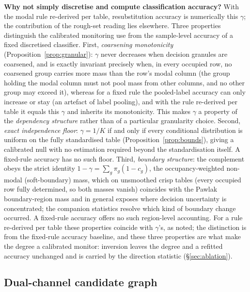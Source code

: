 \documentclass[11pt,a4paper]{article}
\begin{document}
\textbf{Why not simply discretise and compute classification accuracy?}
With the modal rule re-derived per table, resubstitution accuracy is
numerically this $\gamma$; the contribution of the rough-set reading lies
elsewhere. Three properties distinguish the calibrated monitoring use from
the sample-level accuracy of a fixed discretised classifier.
First, \emph{coarsening monotonicity} (Proposition~\ref{prop:granular}):
$\gamma$ never decreases when decision granules are coarsened, and is
exactly invariant precisely when, in every occupied row, no coarsened
group carries more mass than the row's modal column (the group holding
the modal column must not pool mass from other columns, and no other
group may exceed it), whereas for a fixed rule the pooled-label accuracy can only increase
or stay (an artefact of label pooling), and with the rule re-derived per
table it equals this $\gamma$ and inherits its monotonicity. This makes $\gamma$ a property of the
\emph{dependency structure} rather than of a particular granularity choice.
Second, \emph{exact independence floor}: $\gamma = 1/K$ if and only if every
conditional distribution is uniform on the fully standardised table
(Proposition~\ref{prop:bounds}), giving a calibrated null with no
estimation required beyond the standardisation itself. A fixed-rule accuracy
has no such floor.
Third, \emph{boundary structure}: the complement obeys the strict identity
$1-\gamma=\sum_g \pi_g(1-c_g)$, the occupancy-weighted
non-modal (soft-boundary) mass, which on unsmoothed crisp tables (every occupied row fully determined, so both masses vanish) coincides with the Pawlak boundary-region mass and in general exposes where
decision uncertainty is concentrated; the companion statistics resolve which
kind of boundary change occurred. A fixed-rule accuracy offers no such
region-level accounting.
For a rule re-derived per table these properties coincide with $\gamma$'s, as
noted; the distinction is from the fixed-rule accuracy baseline, and these
three properties are what make the degree a calibrated monitor: inversion
leaves the degree and a refitted accuracy unchanged and is carried by the
direction statistic (\S\ref{sec:ablation}).

\subsection{Dual-channel candidate graph}\label{sec:graph}
\end{document}
